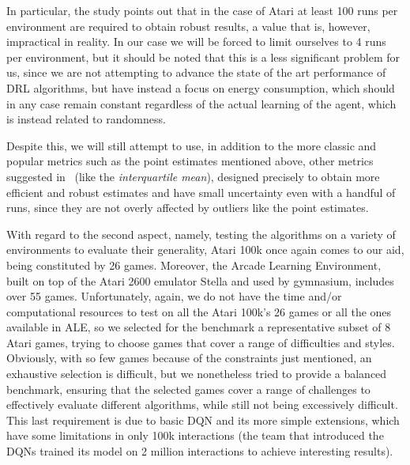 In particular, the study points out that in the case of Atari at least 100 runs per environment are required to obtain robust results, a value that is, however, impractical in reality. In our case we will be forced to limit ourselves to 4 runs per environment, but it should be noted that this is a less significant problem for us, since we are not attempting to advance the state of the art performance of DRL algorithms, but have instead a focus on energy consumption, which should in any case remain constant regardless of the actual learning of the agent, which is instead related to randomness.

Despite this, we will still attempt to use, in addition to the more classic and popular metrics such as the point estimates mentioned above, other metrics suggested in~\cite{agarwal:statistical_precipice} (like the \textit{interquartile mean}), designed precisely to obtain more efficient and robust estimates and have small uncertainty even with a handful of runs, since they are not overly affected by outliers like the point estimates.

With regard to the second aspect, namely, testing the algorithms on a variety of environments to evaluate their generality, Atari 100k once again comes to our aid, being constituted by 26 games. Moreover, the Arcade Learning Environment, built on top of the Atari 2600 emulator Stella and used by gymnasium, includes over 55 games. Unfortunately, again, we do not have the time and/or computational resources to test on all the Atari \num{100}k's 26 games or all the ones available in ALE, so we selected for the benchmark a representative subset of 8 Atari games, trying to choose games that cover a range of difficulties and styles. Obviously, with so few games because of the constraints just mentioned, an exhaustive selection is difficult, but we nonetheless tried to provide a balanced benchmark, ensuring that the selected games cover a range of challenges to effectively evaluate different algorithms, while still not being excessively difficult. This last requirement is due to basic DQN and its more simple extensions, which have some limitations in only 100k interactions (the team that introduced the DQNs trained its model on 2 million interactions to achieve interesting results).


